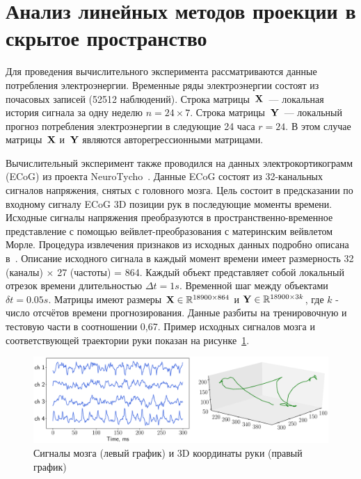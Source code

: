 \hrulefill

\section{Анализ линейных методов проекции в скрытое пространство}
Для проведения вычислительного эксперимента рассматриваются данные потребления электроэнергии.
Временные ряды электроэнергии состоят из почасовых записей (52512 наблюдений). 
Строка матрицы~$\mathbf{X}$~--– локальная история сигнала за одну неделю $n = 24 \times 7$. 
Строка матрицы~$\mathbf{Y}$~--- локальный прогноз потребления электроэнергии в следующие 24 часа $r = 24$. 
В этом случае матрицы~$\mathbf{X}$ и~$\mathbf{Y}$ являются авторегрессионными матрицами.

Вычислительный эксперимент также проводился на данных электрокортикограмм (ECoG) из проекта NeuroTycho~\cite{shimoda2012decoding}.
Данные ECoG состоят из 32-канальных сигналов напряжения, снятых с головного мозга.
Цель состоит в предсказании по входному сигналу ECoG 3D позиции рук в последующие моменты времени.
Исходные сигналы напряжения преобразуются в пространственно-временное представление с помощью вейвлет-преобразования с материнским вейвлетом Морле.
Процедура извлечения признаков из исходных данных подробно описана в~\cite{chao2010long,eliseyev2016penalized}.
Описание исходного сигнала в каждый момент времени имеет размерность 32 (каналы) $\times $ 27 (частоты) = 864.
Каждый объект представляет собой локальный отрезок времени длительностью $\Delta t = 1s$. 
Временной шаг между объектами $\delta t = 0.05 s$.
Матрицы имеют размеры $\mathbf{X} \in \mathbb{R}^{18900 \times 864}$ и $\mathbf{Y} \in \mathbb{R}^{18900 \times 3k}$, где $k$ - число отсчётов времени прогнозирования.
Данные разбиты на тренировочную и тестовую части в соотношении 0,67. 
Пример исходных сигналов мозга и соответствующей траектории руки показан на рисунке~\ref{ch2:fig:ecog_data}.

\begin{figure}
	\centering
	\includegraphics[width=\linewidth]{figs/ch2/ecog_data}
	\caption{Сигналы мозга (левый график) и 3D координаты руки (правый график)}
	\label{ch2:fig:ecog_data}
\end{figure}

